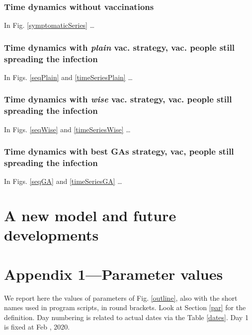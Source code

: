 \documentclass[graybox]{svmult}
\begin{document}
\subsubsection{Time dynamics without vaccinations}
\label{dybWithout}

In Fig. \ref{symptomaticSeries} \ldots

\subsubsection{Time dynamics with \emph{plain} vac. strategy, vac. people still spreading the infection}
\label{dynPlain}

In Figs. \ref{seqPlain} and \ref{timeSeriesPlain} \ldots

\subsubsection{Time dynamics with \emph{wise} vac. strategy, vac. people still spreading the infection}
\label{dynWise}

In Figs. \ref{seqWise} and \ref{timeSeriesWise} \ldots

\subsubsection{Time dynamics with best GAs strategy, vac, people still spreading the infection}
\label{dynGA}

In Figs. \ref{seqGA} and \ref{timeSeriesGA} \ldots

\section{A new model and future developments}
\label{newModel}



\section{Appendix 1---Parameter values}
\label{app1}

We report here the values of parameters of Fig. \ref{outline}, also with the short names used in program scripts, in round brackets. Look at Section \ref{par} for the definition. Day numbering is related to actual dates via the Table \ref{dates}. Day 1 is fixed at Feb , 2020.
\end{document}

